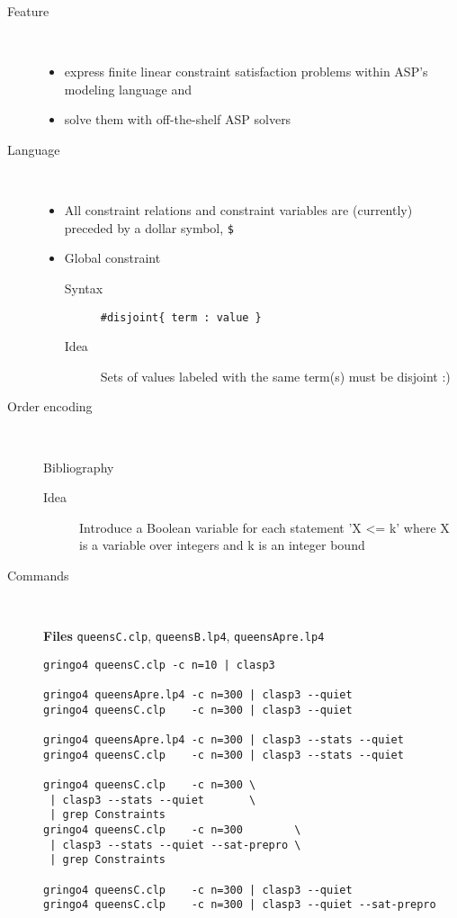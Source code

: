 \begin{description}
\item [Feature] \
\begin{itemize}
\item express finite linear constraint satisfaction problems within ASP's modeling language and
\item solve them with off-the-shelf ASP solvers
\end{itemize}

\item [Language] \
\begin{itemize}
\item All constraint relations and constraint variables are (currently) preceded by a dollar symbol, \texttt{\$}
\item Global constraint
\begin{description}
\item[Syntax] \texttt{\#disjoint\{ term : value \}}
\item [Idea] Sets of values labeled with the same term(s) must be disjoint :)
\end{description}
\end{itemize}

\item [Order encoding]  \
  \begin{description}
  \item [Bibliography] \cite{tatakiba09a}
  \item [Idea] Introduce a Boolean variable for each statement 'X <= k' where X is a variable over integers and k is an integer bound
  \end{description}

\item [Commands] \

\textbf{Files}
\texttt{queensC.clp}, 
\texttt{queensB.lp4}, 
\texttt{queensApre.lp4}

\begin{lstlisting}[numbers=none]
gringo4 queensC.clp -c n=10 | clasp3

gringo4 queensApre.lp4 -c n=300 | clasp3 --quiet
gringo4 queensC.clp    -c n=300 | clasp3 --quiet

gringo4 queensApre.lp4 -c n=300 | clasp3 --stats --quiet
gringo4 queensC.clp    -c n=300 | clasp3 --stats --quiet

gringo4 queensC.clp    -c n=300 \
 | clasp3 --stats --quiet       \
 | grep Constraints
gringo4 queensC.clp    -c n=300        \
 | clasp3 --stats --quiet --sat-prepro \
 | grep Constraints

gringo4 queensC.clp    -c n=300 | clasp3 --quiet             
gringo4 queensC.clp    -c n=300 | clasp3 --quiet --sat-prepro
  
\end{lstlisting}
\end{description}
